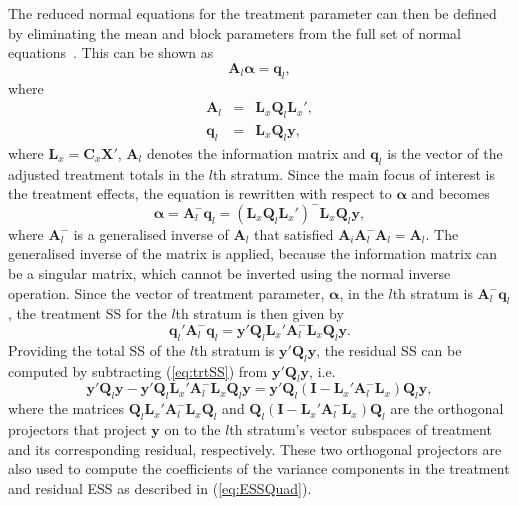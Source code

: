 \documentclass[article]{jss}
\newcommand{\I}{\mathbf{I}}
\newcommand{\X}{\mathbf{X}}
\newcommand{\Q}{\mathbf{Q}}
\newcommand{\A}{\mathbf{A}}
\newcommand{\C}{\mathbf{C}}
\newcommand{\mL}{\mathbf{L}}
\begin{document}
The reduced normal equations for the treatment parameter can then be defined by eliminating the mean and block parameters from the full set of normal equations~\citep{John1987}. This can be shown as
\[
\A_l\bm{\alpha} = \bm{q}_l,
\]
where
\begin{eqnarray*}
\A_l &=& \mL_{x} \Q_l \mL_{x}',\\
\bm{q}_l &=& \mL_{x} \Q_l\bm{y},
\end{eqnarray*}
where $\mL_{x} = \C_x \X'$, $\A_l$ denotes the information matrix and $\bm{q}_l$ is the vector of the adjusted treatment totals in the $l$th stratum. Since the main focus of interest is the treatment effects, the equation is rewritten with respect to $\bm{\alpha}$ and becomes
\begin{equation}
\label{eq:trtVec}
\bm{\alpha} = \A_{l}^{-} \bm{q}_l = (\mL_{x} \Q_l \mL_{x}')^{-} \mL_{x} \Q_l\bm{y},
\end{equation}
where $\A_{l}^{-}$ is a generalised inverse of $\A_{l}$ that satisfied $\A_{i} \A_{l}^{-} \A_{l} = \A_{l}$. The generalised inverse of the matrix is applied, because the information matrix can be a singular matrix, which cannot be inverted using the normal inverse operation. Since the vector of treatment parameter, $\bm{\alpha}$, in the $l$th stratum is $\A_{l}^{-} \bm{q}_l$, the treatment SS for the $l$th stratum is then given by
\begin{equation}
\label{eq:trtSS}
 \bm{q}_{l}' \A_{l}^{-} \bm{q}_{l} = \bm{y}'\Q_l \mL_{x}' \A_{l}^{-} \mL_{x} \Q_l\bm{y}.
\end{equation}
Providing the total SS of the $l$th stratum is $\bm{y}' \Q_l\bm{y}$, the residual SS can be computed by subtracting (\ref{eq:trtSS}) from $\bm{y}' \Q_l\bm{y}$, i.e.\ 
\begin{equation}
\label{eq:resSS}
\bm{y}' \Q_l\bm{y} - \bm{y}'\Q_l \mL_{x}' \A_{l}^{-} \mL_{x} \Q_l\bm{y} = \bm{y}'\Q_l ( \I - \mL_{x}' \A_{l}^{-} \mL_{x}) \Q_l\bm{y},
\end{equation}
where the matrices $\Q_l \mL_{x}' \A_{l}^{-} \mL_{x} \Q_l$ and $\Q_l ( \I - \mL_{x}' \A_{l}^{-} \mL_{x}) \Q_l$ are the orthogonal projectors that project $\bm{y}$ on to the $l$th stratum's vector subspaces of treatment and its corresponding residual, respectively. These two orthogonal projectors are also used to compute the coefficients of the variance components in the treatment and residual ESS as described in (\ref{eq:ESSQuad}). 
\end{document}
